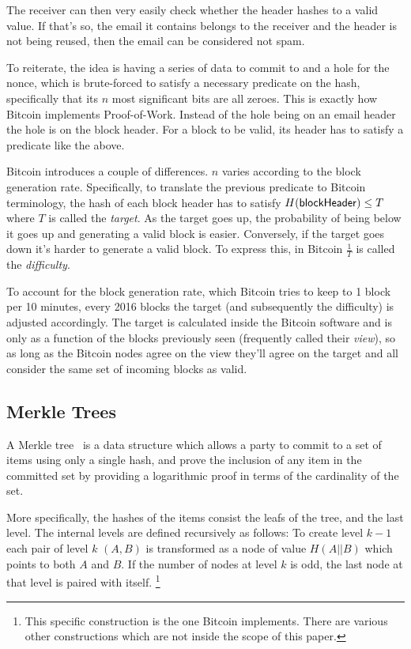 The receiver can then very easily check whether the header hashes to a valid value. If that's so, the email it contains belongs to the receiver and the header is not being reused, then the email can be considered not spam.

To reiterate, the idea is having a series of data to commit to and a hole for the nonce, which is brute-forced to satisfy a necessary predicate on the hash, specifically that its $n$ most significant bits are all zeroes. This is exactly how Bitcoin implements Proof-of-Work. Instead of the hole being on an email header the hole is on the block header. For a block to be valid, its header has to satisfy a predicate like the above.

Bitcoin introduces a couple of differences. $n$ varies according to the block generation rate. Specifically, to translate the previous predicate to Bitcoin terminology, the hash of each block header has to satisfy $H({\sf blockHeader}) \le T$ where $T$ is called the \emph{target}. As the target goes up, the probability of being below it goes up and generating a valid block is easier. Conversely, if the target goes down it's harder to generate a valid block. To express this, in Bitcoin $\frac{1}{T}$ is called the \emph{difficulty}.

To account for the block generation rate, which Bitcoin tries to keep to 1 block per 10 minutes, every 2016 blocks the target (and subsequently the difficulty) is adjusted accordingly. The target is calculated inside the Bitcoin software and is only as a function of the blocks previously seen (frequently called their \emph{view}), so as long as the Bitcoin nodes agree on the view they'll agree on the target and all consider the same set of incoming blocks as valid.

\subsection{Merkle Trees}
A Merkle tree~\cite{merkle} is a data structure which allows a party to commit to a set of items using only a single hash, and prove the inclusion of any item in the committed set by providing a logarithmic proof in terms of the cardinality of the set.

More specifically, the hashes of the items consist the leafs of the tree, and the last level. The internal levels are defined recursively as follows: To create level $k-1$ each pair of level $k$ $(A, B)$ is transformed as a node of value $H(A || B)$ which points to both $A$ and $B$. If the number of nodes at level $k$ is odd, the last node at that level is paired with itself.
\footnote{This specific construction is the one Bitcoin implements. There are various other constructions which are not inside the scope of this paper.}

